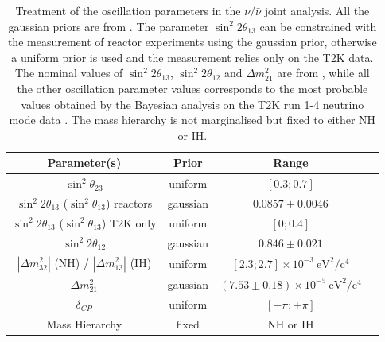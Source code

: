 \begin{table}
	\centering
	\begin{tabular}{| c | c | c | c |}
 	\hline
Parameter(s)	& Prior		& Range    \\
\hline
$\sin^{2}\theta_{23}$	&  uniform 	& $[0.3; 0.7]$      \\
$\sin^{2} 2 \theta_{13}$ ($\sin^{2} \theta_{13}$) reactors		&  gaussian 		& $0.0857 \pm 0.0046$ 	\\
$\sin^{2} 2 \theta_{13}$ ($\sin^{2} \theta_{13}$) T2K only	   	&  uniform		& $[0; 0.4]$ 	\\
$\sin^{2} 2 \theta_{12}$  								&  gaussian 		& $0.846 \pm 0.021$ \\
$|\Delta m^{2}_{32}|$ (NH) / $|\Delta m^{2}_{13}|$ (IH)      		&  uniform		& $ [2.3; 2.7] \times 10^{-3}~\mbox{eV}^2/\mbox{c}^4$		 \\
$\Delta m^{2}_{21}$      								&  gaussian 		& $(7.53 \pm 0.18) \times 10^{-5}~\mbox{eV}^2/\mbox{c}^4$		\\
$\delta_{CP}$                                               				&  uniform 	& $[-\pi; +\pi]$ \\
Mass Hierarchy										&  fixed 		& NH or IH \\  
\hline
\end{tabular}
\caption{
Treatment of the oscillation parameters in the $\nu/\bar{\nu}$ joint analysis. All the gaussian priors are from \cite{pdg_2014}. The parameter $\sin^{2} 2 \theta_{13}$ can be constrained with the measurement of reactor experiments using the gaussian prior, otherwise a uniform prior is used and the measurement relies only on the T2K data. The nominal values of $\sin^2 2 \theta_{13}$, $\sin^2 2 \theta_{12}$ and $\Delta m^2_{21}$ are from \cite{pdg_2014}, while all the other oscillation parameter values corresponds to the most probable values obtained by the Bayesian analysis on the T2K run 1-4 neutrino mode data \cite{T2KLongPaper}. The mass hierarchy is not marginalised but fixed to either NH or IH.
}
\label{tab:osc_param_priors}
\end{table}
